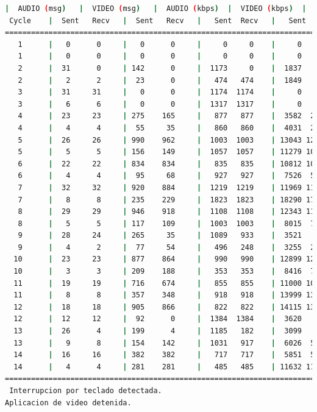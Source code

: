 \begin{lstlisting}[language=bash,basicstyle=\ttfamily\scriptsize]
          |  AUDIO (msg)   |  VIDEO (msg)   |  AUDIO (kbps)  |  VIDEO (kbps)  |   CPU (%)
 Cycle    |  Sent   Recv   |  Sent   Recv   |   Sent  Recv   |   Sent  Recv   | Program System
============================================================================================
   1      |   0      0     |   0      0     |     0     0    |     0     0    | 1000     0
   1      |   0      0     |   0      0     |     0     0    |     0     0    |   0      0
   2      |  31      0     | 142      0     |  1173     0    |  1837     0    |  13     61
   2      |   2      2     |  23      0     |   474   474    |  1849     0    |  50     62
   3      |  31     31     |   0      0     |  1174  1174    |     0     0    |  32     76
   3      |   6      6     |   0      0     |  1317  1317    |     0     0    |  20     76
   4      |  23     23     | 275    165     |   877   877    |  3582  2148    |   9     66
   4      |   4      4     |  55     35     |   860   860    |  4031  2574    |  32     67
   5      |  26     26     | 990    962     |  1003  1003    | 13043 12673    |  41     75
   5      |   5      5     | 156    149     |  1057  1057    | 11279 10759    |  51     77
   6      |  22     22     | 834    834     |   835   835    | 10812 10815    |  34     76
   6      |   4      4     |  95     68     |   927   927    |  7526  5372    |  35     74
   7      |  32     32     | 920    884     |  1219  1219    | 11969 11505    |  36     71
   7      |   8      8     | 235    229     |  1823  1823    | 18290 17808    |  48     72
   8      |  29     29     | 946    918     |  1108  1108    | 12343 11979    |  36     73
   8      |   5      5     | 117    109     |  1003  1003    |  8015  7479    |  30     73
   9      |  28     24     | 265     35     |  1089   933    |  3521   462    |  34     69
   9      |   4      2     |  77     54     |   496   248    |  3255  2288    |  15     73
  10      |  23     23     | 877    864     |   990   990    | 12899 12705    |  23     77
  10      |   3      3     | 209    188     |   353   353    |  8416  7570    |   7     73
  11      |  19     19     | 716    674     |   855   855    | 11000 10359    |  21     74
  11      |   8      8     | 357    348     |   918   918    | 13999 13646    |  24     73
  12      |  18     18     | 905    866     |   822   822    | 14115 13503    |  34     74
  12      |  12     12     |  92      0     |  1384  1384    |  3620     0    |  42     75
  13      |  26      4     | 199      4     |  1185   182    |  3099    62    |  30     67
  13      |   9      8     | 154    142     |  1031   917    |  6026  5564    |  45     66
  14      |  16     16     | 382    382     |   717   717    |  5851  5848    |  21     74
  14      |   4      4     | 281    281     |   485   485    | 11632 11632    |  25     79
============================================================================================
 Interrupcion por teclado detectada.
Aplicacion de video detenida.


\end{lstlisting}
